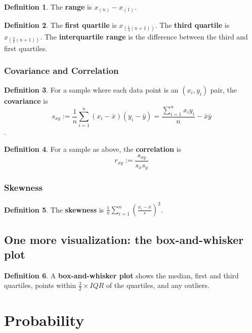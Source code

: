 \documentclass[12pt]{article}
\theoremstyle{definition}
\newtheorem*{defn*}{Definition}
\begin{document}
\begin{defn*}
  The \textbf{range} is $x_{(n)} - x_{(1)}$.
\end{defn*}

\begin{defn*}
  The \textbf{first quartile} is $x_{\left(\frac{1}{4}(n + 1)\right)}$.
  The \textbf{third quartile} is $x_{\left(\frac{3}{4}(n + 1)\right)}$.
  The \textbf{interquartile range} is the difference between the third and first quartiles.
\end{defn*}

\subsubsection{Covariance and Correlation}

\begin{defn*}
  For a sample where each data point is an $(x_i, y_i)$ pair, the \textbf{covariance} is
  $$s_{xy} := \frac{1}{n}\sum_{i = 1}^n(x_i - \bar{x})(y_i - \bar{y}) = \frac{\sum_{i = 1}^nx_iy_i}{n} - \bar{x}\bar{y}$$.
\end{defn*}

\begin{defn*}
  For a sample as above, the \textbf{correlation} is
  $$r_{xy} := \frac{s_{xy}}{s_xs_y}$$
\end{defn*}

\subsubsection{Skewness}

\begin{defn*}
  The \textbf{skewness} is $\frac{1}{n}\sum_{i = 1}^n\left(\frac{x_i - \bar{x}}{s}\right)^3$.
\end{defn*}

\subsection{One more visualization: the box-and-whisker plot}

\begin{defn*}
  A \textbf{box-and-whisker plot} shows the median, first and third quartiles, points within $\frac{3}{2} \times IQR$ of the quartiles, and any outliers.
\end{defn*}

\section{Probability}
\end{document}
